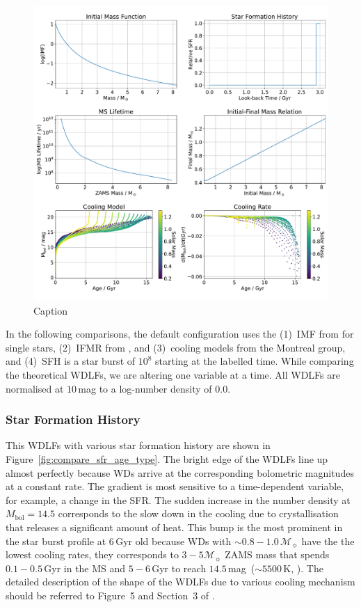 \documentclass[fleqn,usenatbib]{rasti}
\newcommand{\msun}{\mathcal{M}_{\sun}}
\begin{document}
\begin{figure}
    \centering
    \includegraphics[width=\textwidth]{input_model.pdf}
    \caption{Caption}
    \label{fig:input_model}
\end{figure}

In the following comparisons, the default configuration uses the (1)~IMF
from \citet{2003PASP..115..763C} for single stars, (2)~IFMR from
\citet{2008MNRAS.387.1693C}, and (3)~cooling models from the Montreal group,
and (4)~SFH is a star burst of $10^8$ starting at the labelled time.
While comparing the theoretical WDLFs, we are altering one variable at a time.
All WDLFs are normalised at $10$\,mag to a log-number density of $0.0$.

\subsubsection{Star Formation History}
This WDLFs with various star formation history are shown in
Figure~\ref{fig:compare_sfr_age_type}. The bright edge of the WDLFs line up
almost perfectly because WDs arrive at the corresponding bolometric magnitudes
at a constant rate. The gradient is most sensitive to a time-dependent
variable, for example, a change in the SFR. The sudden increase in the number
density at $M_\mathrm{bol}=14.5$ corresponds to the slow down in the cooling
due to crystallisation that releases a significant amount of heat. This bump
is the most prominent in the star burst profile at $6$\,Gyr old because WDs
with $\sim0.8-1.0\,\msun$ have the the lowest cooling rates, they corresponds
to $3-5\msun$ ZAMS mass that spends $0.1-0.5$\,Gyr in the MS and $5-6$\,Gyr
to reach $14.5$\,mag~($\sim 5500$\,K, \citealp{2019ApJ...876...67B}). The
detailed description of the shape of the WDLFs due to various cooling
mechanism should be referred to  Figure~5 and Section~3
of \citep{2001PASP..113..409F}.
\end{document}
